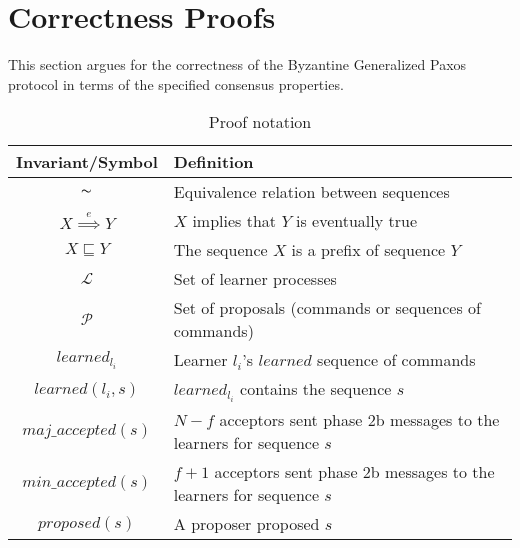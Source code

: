 \section{Correctness Proofs} \label{proof}

This section argues for the correctness of the Byzantine Generalized Paxos protocol in terms of the specified consensus properties.\par

\begin{table}[h!]
	\renewcommand{\arraystretch}{1.5}
	\centering
	\begin{tabularx}{\linewidth}{ |c|X|}
		\hline
		Invariant/Symbol & Definition \\
		\hline
		$\thicksim$ & Equivalence relation between sequences \\
		\hline
		$X \overset{e}{\implies} Y$ & $X$ implies that $Y$ is eventually true \\
		\hline
		$X \sqsubseteq Y$ & The sequence $X$ is a prefix of sequence $Y$ \\
		\hline
		$\mathcal{L}$ & Set of learner processes \\
		\hline
		$\mathcal{P}$ & Set of proposals (commands or sequences of commands) \\
		\hline
		$learned_{l_i}$ & Learner $l_i$'s $learned$ sequence of commands \\
		\hline
		$learned(l_i,s)$ & $learned_{l_i}$ contains the sequence $s$ \\
		\hline
		$maj\_accepted(s)$ & $N-f$ acceptors sent phase 2b messages to the learners for sequence $s$ \\
		\hline
		$min\_accepted(s)$ & $f+1$ acceptors sent phase 2b messages to the learners for sequence $s$ \\
		\hline
		$proposed(s)$ & A proposer proposed $s$ \\
		\hline
		
	\end{tabularx} 
	\vspace{\smallskipamount}
	\caption{Proof notation} 
	\label{table:1}
\end{table}

